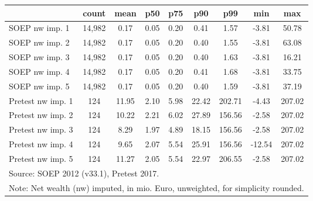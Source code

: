{
\def\sym#1{\ifmmode^{#1}\else\(^{#1}\)\fi}
\begin{tabular}{l*{1}{cccccccc}}
\hline\hline
                                            &       count&        mean&         p50&         p75&         p90&         p99&         min&         max\\
\hline
SOEP nw imp. 1                              &      14,982&        0.17&        0.05&        0.20&        0.41&        1.57&       -3.81&       50.78\\
SOEP nw imp. 2                              &      14,982&        0.17&        0.05&        0.20&        0.40&        1.55&       -3.81&       63.08\\
SOEP nw imp. 3                              &      14,982&        0.17&        0.05&        0.20&        0.40&        1.63&       -3.81&       16.21\\
SOEP nw imp. 4                              &      14,982&        0.17&        0.05&        0.20&        0.41&        1.68&       -3.81&       33.75\\
SOEP nw imp. 5                              &      14,982&        0.17&        0.05&        0.20&        0.40&        1.59&       -3.81&       37.19\\
Pretest nw imp. 1                           &         124&       11.95&        2.10&        5.98&       22.42&      202.71&       -4.43&      207.02\\
Pretest nw imp. 2                           &         124&       10.22&        2.21&        6.02&       27.89&      156.56&       -2.58&      207.02\\
Pretest nw imp. 3                           &         124&        8.29&        1.97&        4.89&       18.15&      156.56&       -2.58&      207.02\\
Pretest nw imp. 4                           &         124&        9.65&        2.07&        5.54&       25.91&      156.56&      -12.54&      207.02\\
Pretest nw imp. 5                           &         124&       11.27&        2.05&        5.54&       22.97&      206.55&       -2.58&      207.02\\
\hline\hline
\multicolumn{9}{l}{\footnotesize Source: SOEP 2012 (v33.1), Pretest 2017.}\\
\multicolumn{9}{l}{\footnotesize Note: Net wealth (nw) imputed, in mio. Euro, unweighted, for simplicity rounded.}\\
\end{tabular}
}
